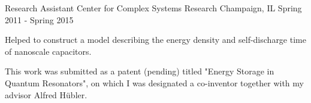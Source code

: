 \begin{cventries}
  \cventry
  {Research Assistant} %
  {Center for Complex Systems Research} %
  {Champaign, IL}
  {Spring 2011 - Spring 2015}
  {
      \begin{cvitems} 
          \item {Helped to construct a model describing the energy density and
              self-discharge time of nanoscale capacitors.}
          \item {This work was submitted as a patent (pending) titled "Energy
                  Storage in Quantum Resonators", on which I was designated a
                  co-inventor together with my advisor Alfred H\"ubler.}
      \end{cvitems}
  }

\end{cventries}

